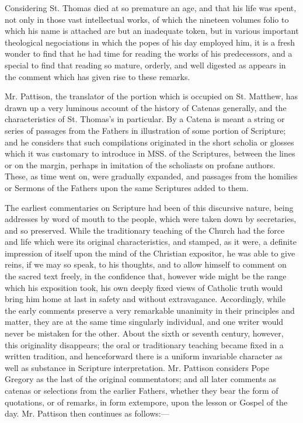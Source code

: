 Considering St. Thomas died at so premature an age,
and that his life was spent, not only in those vast intellectual works,
of which the nineteen volumes folio to which his name is attached are
but an inadequate token, but in various important theological
negociations in which the popes of his day employed him, it is a fresh
wonder to find that he had time for reading the works of his
predecessors, and a special to find that reading so mature, orderly, and
well digested as appears in the comment which has given rise to these
remarks.

Mr. Pattison, the translator of the portion which
is occupied on St. Matthew, has drawn up a very luminous account of the
history of Catenas generally, and the characteristics of St. Thomas's in
particular. By a Catena is meant a string or series of passages from the
Fathers in illustration of some portion of Scripture; and he considers
that such compilations originated in the short scholia or glosses which
it was customary to introduce in MSS. of the Scriptures, between the
lines or on the margin, perhaps in imitation of the scholiasts on
profane authors. These, as time went on, were gradually expanded, and
passages from the homilies or Sermons of the Fathers upon the same
Scriptures added to them.

The earliest commentaries on Scripture had been of
this discursive nature, being addresses by word of mouth to the
people, which were taken down by secretaries, and so preserved. While
the traditionary teaching of the Church had the force and life which
were its original characteristics, and stamped, as it were, a definite
impression of itself upon the mind of the Christian expositor, he was
able to give reins, if we may so speak, to his thoughts, and to allow
himself to comment on the sacred text freely, in the confidence that,
however wide might be the range which his exposition took, his own
deeply fixed views of Catholic truth would bring him home at last in
safety and without extravagance. Accordingly, while the early comments
preserve a very remarkable unanimity in their principles and matter,
they are at the same time singularly individual, and one writer would
never be mistaken for the other. About the sixth or seventh century,
however, this originality disappears; the oral or traditionary teaching
became fixed in a written tradition, and henceforward there is a uniform
invariable character as well as substance in Scripture interpretation.
Mr. Pattison considers Pope Gregory as the last of the original
commentators; and all later comments as catenas or selections from the
earlier Fathers, whether they bear the form of quotations, or of
remarks, in form extempore, upon the lesson or Gospel of the day. Mr.
Pattison then continues as follows:—

